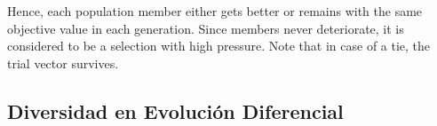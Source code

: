 Hence, each population member either gets better or remains with the same objective value in each generation.
%
Since members never deteriorate, it is considered to be a selection with high pressure.
%
Note that in case of a tie, the trial vector survives.

%

\subsection{Diversidad en Evolución Diferencial}

